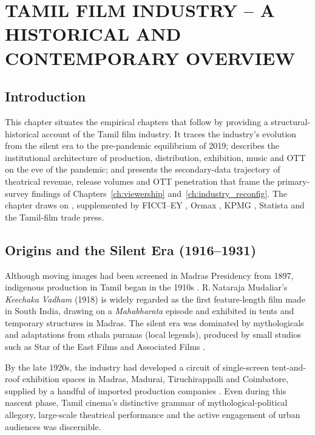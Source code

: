 \chapter{TAMIL FILM INDUSTRY -- A HISTORICAL AND CONTEMPORARY OVERVIEW}
\label{ch:industry_overview}

\section{Introduction}
\label{sec:overview_intro}

This chapter situates the empirical chapters that follow by providing
a structural-historical account of the Tamil film industry.  It
traces the industry's evolution from the silent era to the
pre-pandemic equilibrium of 2019; describes the institutional
architecture of production, distribution, exhibition, music and OTT
on the eve of the pandemic; and presents the secondary-data
trajectory of theatrical revenue, release volumes and OTT
penetration that frame the primary-survey findings of
Chapters~\ref{ch:viewership} and~\ref{ch:industry_reconfig}.  The
chapter draws on \citet{baskaran1996,baskaran2009,velayutham2008,
nakassis2017,prasad2014,kohlikhandekar2013}, supplemented by
FICCI--EY \citeyearpar{ficciey2018,ficciey2019,ficciey2020,
ficciey2021,ficciey2022,ficciey2023,ficciey2024}, Ormax
\citeyearpar{ormax2022,ormax2023,ormax2024}, KPMG
\citeyearpar{kpmg2019,kpmg2021,kpmg2022,kpmg2023}, Statista
\citeyearpar{statista2019,statista2023,statista2024} and the
Tamil-film trade press.

\section{Origins and the Silent Era (1916--1931)}
\label{sec:silent}

Although moving images had been screened in Madras Presidency from
1897, indigenous production in Tamil began in the 1910s
\citep{baskaran1996}.  R.\,Nataraja Mudaliar's \emph{Keechaka
Vadham} (1918) is widely regarded as the first feature-length film
made in South India, drawing on a \emph{Mahabharata} episode and
exhibited in tents and temporary structures in Madras.  The silent
era was dominated by mythologicals and adaptations from sthala
puranas (local legends), produced by small studios such as Star of
the East Films and Associated Films \citep{baskaran1996,
hardgrave1973}.

By the late 1920s, the industry had developed a circuit of
single-screen tent-and-roof exhibition spaces in Madras, Madurai,
Tiruchirappalli and Coimbatore, supplied by a handful of imported
production companies \citep{baskaran1996,velayutham2008}.  Even
during this nascent phase, Tamil cinema's distinctive grammar of
mythological-political allegory, large-scale theatrical performance
and the active engagement of urban audiences was discernible.

